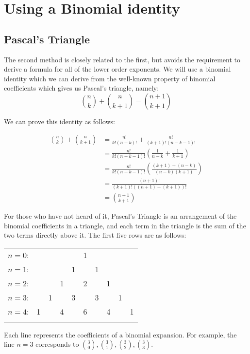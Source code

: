 \documentclass{article}
\begin{document}
\section{Using a Binomial identity}

\subsection{Pascal's Triangle}

The second method is closely related to the first, but avoids the requirement to derive
a formula for all of the lower order exponents. We will use a binomial identity which
we can derive from the well-known property of binomial coefficients which gives us
Pascal's triangle, namely:
\[\binom{n}{k} + \binom{n}{k+1} = \binom{n+1}{k+1} \]

We can prove this identity as follows:

\begin{align*}
	\binom{n}{k} + \binom{n}{k+1} &= \frac{n!}{k!(n-k)!} + \frac{n!}{(k+1)!(n-k-1)!} \\
	&= \frac{n!}{k!(n-k-1)!}\left(\frac{1}{n-k} + \frac{1}{k+1}\right) \\
	&= \frac{n!}{k!(n-k-1)!}\left(\frac{(k+1)+(n-k)}{(n-k)(k+1)}\right) \\
	&= \frac{(n+1)!}{(k+1)!((n+1)-(k+1))!} \\
	&= \binom{n+1}{k+1}
\end{align*}

For those who have not heard of it, Pascal's Triangle is an arrangement of the
binomial coefficients in a triangle, and each term in the triangle is the sum of the two
terms directly above it. The first five rows are as follows:

\begin{tabular}{rccccccccc}
$n=0$:&    &    &    &    &  1\\\noalign{\smallskip\smallskip}
$n=1$:&    &    &    &  1 &    &  1\\\noalign{\smallskip\smallskip}
$n=2$:&    &    &  1 &    &  2 &    &  1\\\noalign{\smallskip\smallskip}
$n=3$:&    &  1 &    &  3 &    &  3 &    &  1\\\noalign{\smallskip\smallskip}
$n=4$:&  1 &    &  4 &    &  6 &    &  4 &    &  1\\\noalign{\smallskip\smallskip}
\end{tabular}

Each line represents the coefficients of a binomial expansion. For example, the line $n=3$
corresponds to $\binom{3}{0}, \binom{3}{1}, \binom{3}{2}, \binom{3}{3}$.
\end{document}
